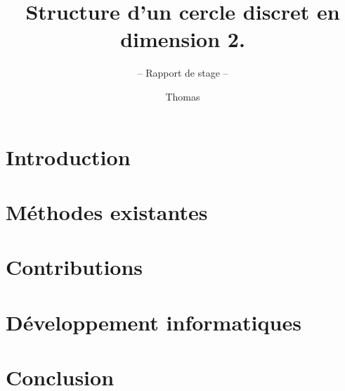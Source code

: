 \documentclass[envcountsame,envcountchap]{svmono}
\begin{document}
\author{ Thomas}
\title{Structure d'un cercle discret en dimension 2.}
\subtitle{-- Rapport de stage --}
\maketitle

\frontmatter%

%

\tableofcontents


\mainmatter%
%
\part{Introduction}


\part{Méthodes existantes}


\part{Contributions}


\part{Développement informatiques}


\part{Conclusion}


%
%

\backmatter%
%

\printindex

\end{document}
